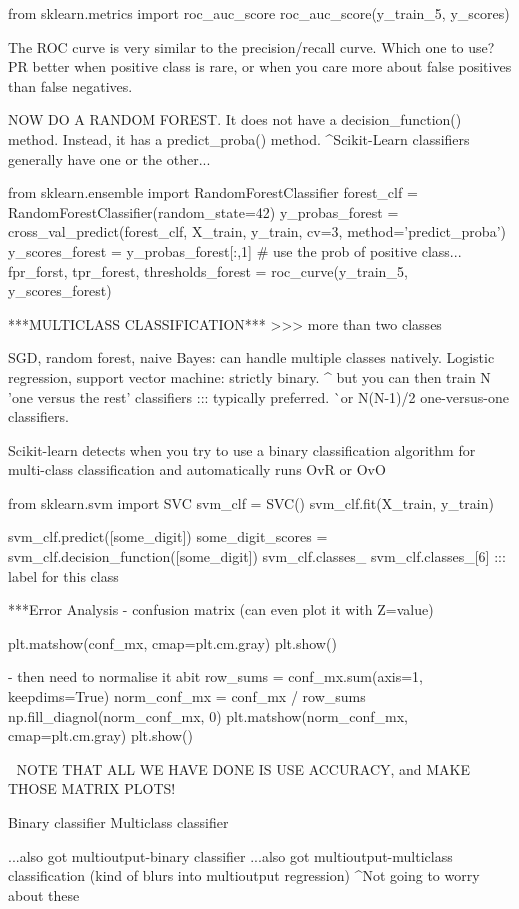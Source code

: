 from sklearn.metrics import roc_auc_score
roc_auc_score(y_train_5, y_scores)

The ROC curve is very similar to the precision/recall curve.
Which one to use?
PR better when positive class is rare,
or when you care more about false positives than false negatives.

NOW DO A RANDOM FOREST.
It does not have a decision_function() method.
Instead, it has a predict_proba() method.
^Scikit-Learn classifiers generally have one or the other...

from sklearn.ensemble import RandomForestClassifier
forest_clf = RandomForestClassifier(random_state=42)
y_probas_forest = cross_val_predict(forest_clf, X_train, y_train, cv=3, method='predict_proba')
y_scores_forest = y_probas_forest[:,1] # use the prob of positive class...
fpr_forst, tpr_forest, thresholds_forest = roc_curve(y_train_5, y_scores_forest)


***MULTICLASS CLASSIFICATION***
>>> more than two classes

SGD, random forest, naive Bayes: can handle multiple classes natively.
Logistic regression, support vector machine: strictly binary.
^ but you can then train N 'one versus the rest' classifiers ::: typically preferred.
^^ or N(N-1)/2 one-versus-one classifiers. 

Scikit-learn detects when you try to use a binary classification algorithm for multi-class classification
and automatically runs OvR or OvO

from sklearn.svm import SVC
svm_clf = SVC()
svm_clf.fit(X_train, y_train)

svm_clf.predict([some_digit])
some_digit_scores = svm_clf.decision_function([some_digit])
svm_clf.classes_
svm_clf.classes_[6] ::: label for this class

***Error Analysis
- confusion matrix (can even plot it with Z=value)

plt.matshow(conf_mx, cmap=plt.cm.gray)
plt.show()

- then need to normalise it abit
row_sums = conf_mx.sum(axis=1, keepdims=True)
norm_conf_mx = conf_mx / row_sums
np.fill_diagnol(norm_conf_mx, 0)
plt.matshow(norm_conf_mx, cmap=plt.cm.gray)
plt.show()

^^^
NOTE THAT ALL WE HAVE DONE IS USE ACCURACY, and MAKE THOSE MATRIX PLOTS!

Binary classifier
Multiclass classifier

...also got multioutput-binary classifier
...also got multioutput-multiclass classification (kind of blurs into multioutput regression)
^Not going to worry about these








